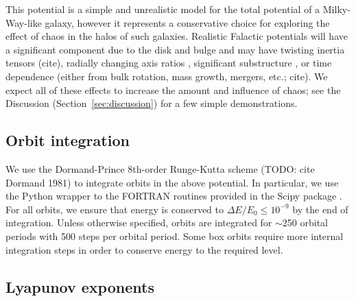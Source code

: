 \documentclass[letterpaper,12pt,preprint]{aastex}
\begin{document}
This potential is a simple and unrealistic model for the total potential of a Milky-Way-like galaxy, however it represents a conservative choice for exploring the effect of chaos in the halos of such galaxies. Realistic Falactic potentials will have a significant component due to the disk and bulge and may have twisting inertia tensors (cite), radially changing axis ratios \citep[e.g.,][]{veraciro11}, significant substructure \citep{zemp09}, or time dependence (either from bulk rotation, mass growth, mergers, etc.; cite). We expect all of these effects to increase the amount and influence of chaos; see the Discussion (Section~\ref{sec:discussion}) for a few simple demonstrations.

\subsection{Orbit integration}\label{sec:integration}

We use the Dormand-Prince 8th-order Runge-Kutta scheme (TODO: cite Dormand 1981) to integrate orbits in the above potential. In particular, we use the Python wrapper to the FORTRAN routines provided in the Scipy package \citep{scipy}. For all orbits, we ensure that energy is conserved to $\Delta E/E_0 \leq 10^{-9}$ by the end of integration. Unless otherwise specified, orbits are integrated for $\sim$250 orbital periods with 500 steps per orbital period. Some box orbits require more internal integration steps in order to conserve energy to the required level. 

\subsection{Lyapunov exponents} \label{sec:lyap}
\end{document}
